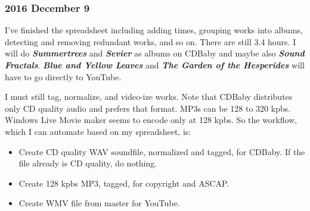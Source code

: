 \documentclass[english,11pt,letterpaper,onecolumn]{scrartcl}
\begin{document}
\subsubsection{2016 December 9}

I've finished the spreadsheet including adding times, grouping works into albums, detecting and removing redundant works, and so on. There are still 3.4 hours. I will do \emph{\textbf{Summertrees}} and \emph{\textbf{Sevier}} as albums on CDBaby and maybe also \emph{\textbf{Sound Fractals}}. \emph{\textbf{Blue and Yellow Leaves}} and \emph{\textbf{The Garden of the Hesperides}} will have to go directly to YouTube.

I must still tag, normalize, and video-ize works. Note that CDBaby distributes only CD quality audio and prefers that format. MP3s can be 128 to 320 kpbs. Windows Live Movie maker seems to encode only at 128 kpbs. So the workflow, which I can automate based on my spreadsheet, is:

\begin{itemize}
	\item Create CD quality WAV soundfile, normalized and tagged, for CDBaby. If the file already is CD quality, do nothing.
	\item Create 128 kpbs MP3, tagged, for copyright and ASCAP.
	\item Create WMV file from master for YouTube.
\end{itemize}
\end{document}
